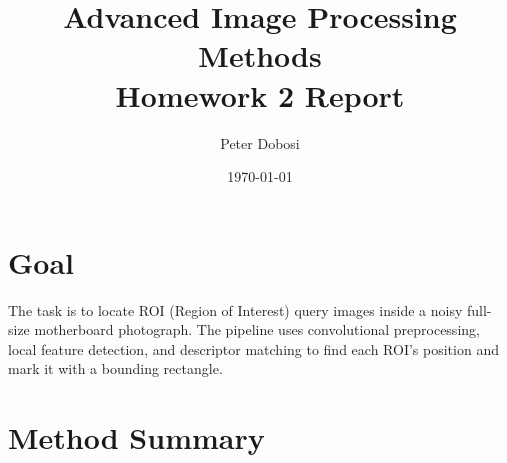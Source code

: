 \documentclass[11pt,a4paper]{article}
\title{Advanced Image Processing Methods\\Homework 2 Report}
\author{Peter Dobosi}
\date{\today}
\begin{document}
\maketitle

\section*{Goal}
The task is to locate ROI (Region of Interest) query images inside a noisy full-size motherboard photograph.
The pipeline uses convolutional preprocessing, local feature detection, and descriptor matching to find each ROI's position and mark it with a bounding rectangle.

\section*{Method Summary}
\end{document}
